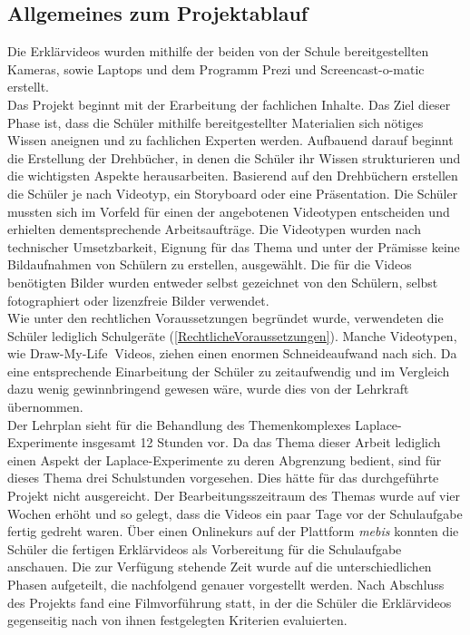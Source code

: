 \documentclass[a4paper,12pt,twoside=false]{scrartcl}
\begin{document}
 \subsection{Allgemeines zum Projektablauf}
 Die Erklärvideos wurden mithilfe der beiden von der Schule bereitgestellten Kameras, sowie Laptops und dem Programm Prezi und Screencast-o-matic erstellt. \\
 Das Projekt beginnt mit der Erarbeitung der fachlichen Inhalte. Das Ziel dieser Phase ist, dass die Schüler mithilfe bereitgestellter Materialien sich nötiges Wissen aneignen und zu fachlichen Experten werden. Aufbauend darauf beginnt die Erstellung der Drehbücher, in denen die Schüler ihr Wissen strukturieren und die wichtigsten Aspekte herausarbeiten. Basierend auf den Drehbüchern erstellen die Schüler je nach Videotyp, ein Storyboard oder eine Präsentation. Die Schüler mussten sich im Vorfeld für einen der angebotenen Videotypen entscheiden und erhielten dementsprechende Arbeitsaufträge. Die Videotypen wurden nach technischer Umsetzbarkeit, Eignung für das Thema und unter der Prämisse keine Bildaufnahmen von Schülern zu erstellen, ausgewählt. Die für die Videos benötigten Bilder wurden entweder selbst gezeichnet von den Schülern, selbst fotographiert oder lizenzfreie Bilder verwendet. \\
 Wie unter den rechtlichen Voraussetzungen begründet wurde, verwendeten die Schüler lediglich Schulgeräte (\ref{RechtlicheVoraussetzungen}). Manche Videotypen, wie \glqq Draw-My-Life\grqq $~$ Videos, ziehen einen enormen Schneideaufwand nach sich. Da eine entsprechende Einarbeitung der Schüler zu zeitaufwendig und im Vergleich dazu wenig gewinnbringend gewesen wäre, wurde dies von der Lehrkraft übernommen. \\
 Der Lehrplan sieht für die Behandlung des Themenkomplexes Laplace-Experimente insgesamt 12 Stunden vor. Da das Thema dieser Arbeit lediglich einen Aspekt der Laplace-Experimente zu deren Abgrenzung bedient, sind für dieses Thema drei Schulstunden vorgesehen. Dies hätte für das durchgeführte Projekt nicht ausgereicht. Der Bearbeitungsszeitraum des Themas wurde auf vier Wochen erhöht und so gelegt, dass die Videos ein paar Tage vor der Schulaufgabe fertig gedreht waren. Über einen Onlinekurs auf der Plattform \textit{mebis} konnten die Schüler die fertigen Erklärvideos als Vorbereitung für die Schulaufgabe anschauen. Die zur Verfügung stehende Zeit wurde auf die unterschiedlichen Phasen aufgeteilt, die nachfolgend genauer vorgestellt werden. Nach Abschluss des Projekts fand eine Filmvorführung statt, in der die Schüler die Erklärvideos gegenseitig nach von ihnen festgelegten Kriterien evaluierten. 
\end{document}
